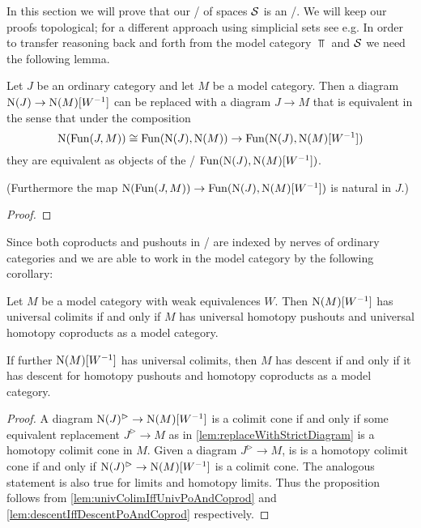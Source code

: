 In this section we will prove that our \inftycat/ of spaces $\mathcal{S}$ is an \inftytop/.
We will keep our proofs topological; for a different approach using simplicial sets see e.g. %
In order to transfer reasoning back and forth from the model category $\Top$ and $\mathcal{S}$ we need the following lemma.
\begin{lemma}\label{lem:replaceWithStrictDiagram} %
    Let $J$ be an ordinary category and let $M$ be a model category.
    Then a diagram $\operatorname{N}(J)\to\operatorname{N}(M)[W^{-1}]$ can be replaced with a diagram $J\to M$ that is equivalent in the sense that under the composition
    \begin{equation*}
        \N(\Fun(J,M))\cong\Fun(\N(J),\N(M))\to\Fun(\N(J),\N(M)[W^{-1}]) %
    \end{equation*} 
    they are equivalent as objects of the \inftycat/ $\operatorname{Fun}(\operatorname{N}(J),\operatorname{N}(M)[W^{-1}])$.

    (Furthermore the map $\operatorname{N}(\operatorname{Fun}(J,M))\to\operatorname{Fun}(\operatorname{N}(J),\operatorname{N}(M)[W^{-1}])$ is natural in $J$.)
    \begin{proof}
    \end{proof}
\end{lemma}
Since both coproducts and pushouts in \inftycats/ are indexed by nerves of ordinary categories and we are able to work in the model category by the following corollary:
\begin{corollary}\label{cor:sufficientToProveInModCat}
    Let $M$ be a model category with weak equivalences $W$. 
    Then $\operatorname{N}(M)[W^{-1}]$ has universal colimits if and only if $M$ has universal homotopy pushouts and universal homotopy coproducts as a model category.
    
    If further $\operatorname{N}(M)[W^{-1}]$ has universal colimits, then $M$ has descent if and only if it has descent for homotopy pushouts and homotopy coproducts as a model category.
    \begin{proof}
        A diagram $\operatorname{N}(J)^{\rhd}\to\operatorname{N}(M)[W^{-1}]$ is a colimit cone if and only if some equivalent replacement $J^{\rhd}\to M$ as in \cref{lem:replaceWithStrictDiagram} is a homotopy colimit cone in $M$.
        Given a diagram $J^{\rhd}\to M$, is is a homotopy colimit cone if and only if $\operatorname{N}(J)^{\rhd}\to\operatorname{N}(M)[W^{-1}]$ is a colimit cone.
        The analogous statement is also true for limits and homotopy limits.
        Thus the proposition follows from \cref{lem:univColimIffUnivPoAndCoprod} and \cref{lem:descentIffDescentPoAndCoprod} respectively.
    \end{proof}
\end{corollary}
